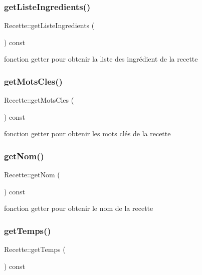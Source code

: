 \subsubsection{\texorpdfstring{get\+Liste\+Ingredients()}{getListeIngredients()}}
{\footnotesize\ttfamily Recette\+::get\+Liste\+Ingredients (\begin{DoxyParamCaption}{ }\end{DoxyParamCaption}) const}



fonction getter pour obtenir la liste des ingrédient de la recette 

\mbox{\label{classRecette_a509d4cfe5b696a08c4b6675472d6e481}} 
\subsubsection{\texorpdfstring{get\+Mots\+Cles()}{getMotsCles()}}
{\footnotesize\ttfamily Recette\+::get\+Mots\+Cles (\begin{DoxyParamCaption}{ }\end{DoxyParamCaption}) const}



fonction getter pour obtenir les mots clés de la recette 

\mbox{\label{classRecette_afab5d7deab9130137037872a7a42ef3c}} 
\subsubsection{\texorpdfstring{get\+Nom()}{getNom()}}
{\footnotesize\ttfamily Recette\+::get\+Nom (\begin{DoxyParamCaption}{ }\end{DoxyParamCaption}) const}



fonction getter pour obtenir le nom de la recette 

\mbox{\label{classRecette_a9ac38f333d17699fb6601bca332d8567}} 
\subsubsection{\texorpdfstring{get\+Temps()}{getTemps()}}
{\footnotesize\ttfamily Recette\+::get\+Temps (\begin{DoxyParamCaption}{ }\end{DoxyParamCaption}) const}



